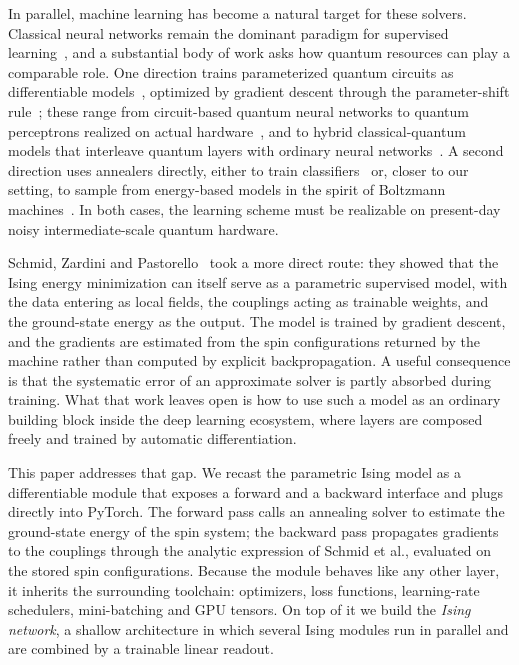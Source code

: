 \documentclass{ieeeaccess}
\begin{document}
In parallel, machine learning has become a natural target for these solvers.
Classical neural networks remain the dominant paradigm for supervised
learning~\cite{Alzubaidi2021dl}, and a substantial body of work asks how
quantum resources can play a comparable role. One direction trains
parameterized quantum circuits as differentiable models~\cite{Benedetti2019pqc,schuld2015introduction,dunjko2018machine},
optimized by gradient descent through the parameter-shift
rule~\cite{Mitarai2018qcl,wierichs2022general,pastorello2023concise}; these range from circuit-based quantum neural
networks to quantum perceptrons realized on actual
hardware~\cite{Tacchino2019neuron}, and to hybrid classical-quantum models
that interleave quantum layers with ordinary neural
networks~\cite{Mari2020transfer}. A second direction uses annealers directly,
either to train classifiers~\cite{willsch2020support,date2021qubo} or, closer to our setting, to sample from
energy-based models in the spirit of Boltzmann machines~\cite{Amin2018qbm}.
In both cases, the learning scheme must be realizable on present-day
noisy intermediate-scale quantum hardware.

Schmid, Zardini and
Pastorello~\cite{10.21468/SciPostPhysCore.7.1.013} took a more direct route:
they showed that the Ising energy minimization can itself serve as a
parametric supervised model, with the data entering as local fields, the
couplings acting as trainable weights, and the ground-state energy as the
output. The model is trained by gradient descent, and the gradients are
estimated from the spin configurations returned by the machine rather than
computed by explicit backpropagation. A useful consequence is that the
systematic error of an approximate solver is partly absorbed during training.
What that work leaves open is how to use such a model as an ordinary building
block inside the deep learning ecosystem, where layers are composed freely
and trained by automatic differentiation.

This paper addresses that gap. We recast the parametric Ising model as a
differentiable module that exposes a forward and a backward interface and
plugs directly into PyTorch. The forward pass calls an annealing solver to
estimate the ground-state energy of the spin system; the backward pass
propagates gradients to the couplings through the analytic expression of
Schmid et al., evaluated on the stored spin configurations. Because the
module behaves like any other layer, it inherits the surrounding toolchain:
optimizers, loss functions, learning-rate schedulers, mini-batching and GPU
tensors. On top of it we build the \textit{Ising network}, a shallow
architecture in which several Ising modules run in parallel and are combined
by a trainable linear readout.
\end{document}
